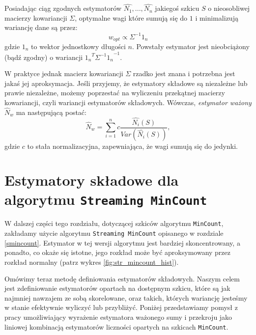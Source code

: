 \begin{lemma}
	 Posiadając ciąg zgodnych estymatorów $\hat{N_1}, ..., \hat{N_n}$ jakiegoś szkicu $S$ o nieosobliwej macierzy kowariancji $\Sigma$, optymalne wagi które sumują się do $1$ i minimalizują wariancję dane są przez:
	 \begin{equation}
	 	w_{opt} \propto  \Sigma^{-1}1_n
	 \end{equation}
	 gdzie $1_n$ to wektor jednostkowy długości $n$. Powstały estymator jest nieobciążony (bądź zgodny) o wariancji ${{1_n}^{T}\Sigma^{-1}1_n}^{-1}$.
\end{lemma}
W praktyce jednak macierz kowariancji $\Sigma$ rzadko jest znana i potrzebna jest jakaś jej aproksymacja.
Jeśli przyjemy, że estymatory składowe są niezależne
lub prawie niezależne, możemy poprzestać na wyliczeniu przekątnej macierzy kowariancji, czyli wariancji estymatorów składowych. Wówczas, \textit{estymator ważony} $\hat{N}_w$  ma następującą postać:
\begin{equation}
\label{weighted_est}
    \hat{N}_w = \sum_{i=1}^{n}c\frac{\hat{N_i}(S)}{Var(\hat{N_i}(S))},
\end{equation}
gdzie $c$ to stała normalizacyjna, zapewniająca, że wagi sumują się do jedynki.

\section{Estymatory składowe dla algorytmu \texttt{Streaming MinCount}}

W dalszej części tego rozdziału, dotyczącej szkiców algorytmu \texttt{MinCount}, zakładamy użycie algorytmu \texttt{Streaming MinCount} opisanego w rozdziale \ref{smincount}.
Estymator w tej wersji algorytmu jest bardziej skoncentrowany, a ponadto, co okaże się istotne, jego rozkład może być aproksymowany przez rozkład normalny (patrz wykres \ref{fig:str_mincount_hist}). 

Omówimy teraz metodę  definiowania estymatorów składowych. Naszym celem jest zdefiniowanie estymatorów opartach na dostępnym szkicu, które są jak najmniej nawzajem ze sobą skorelowane, oraz takich, których wariancję jesteśmy w stanie efektywnie wyliczyć lub przybliżyć. Poniżej przedstawiamy pomysł z pracy \cite{ting} umożliwiający wyrażenie estymatora ważonego sumy i przekroju jako  liniowej kombinacją  estymatorów liczności opartych na szkicach \texttt{MinCount}.

